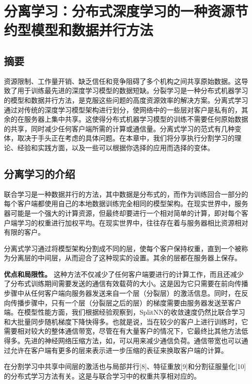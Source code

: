 \chapter{分离学习：分布式深度学习的一种资源节约型模型和数据并行方法}

\section*{摘要}
资源限制、工作量开销、缺乏信任和竞争阻碍了多个机构之间共享原始数据。这导致了用于训练最先进的深度学习模型的数据短缺。分裂学习是一种分布式机器学习的模型和数据并行方法，是克服这些问题的高度资源效率的解决方案。分离式学习通过对传统的深度学习模型架构进行划分，使网络中的一些层对客户是私有的，其余的在服务器上集中共享。这使得分布式机器学习模型的训练不需要任何原始数据的共享，同时减少任何客户端所需的计算或通信量。分离式学习的范式有几种变体，取决于手头正在考虑的具体问题。在本章中，我们将分享执行分割学习的理论、经验和实践方面，以及一些可以根据你选择的应用而选择的变体。

\section{分离学习的介绍}
联合学习是一种数据并行的方法，其中数据是分布式的，而作为训练回合一部分的每个客户端都使用自己的本地数据训练完全相同的模型架构。在现实世界中，服务器可能是一个强大的计算资源，但最终却要进行一个相对简单的计算，即对每个客户端学习的权重进行加权平均。在现实世界中，往往存在着与服务器相比资源相对有限的客户。

分离式学习通过将模型架构分割成不同的层，使每个客户保持权重，直到一个被称为分离层的中间层，从而迎合了这种现实的设置。其余的层都在服务器上保存。

\textbf{优点和局限性。} 这种方法不仅减少了任何客户端要进行的计算工作，而且还减少了分布式训练期间需要发送的通信有效载荷的大小。这是因为它只需要在前向传播步骤中从任何客户端向服务器发送来自一个层（分裂层）的激活信息。同时，在反向传播步骤中，只有一个层（分裂层之后的层）的梯度需要由服务器发送至客户端。在模型性能方面，我们根据经验观察到，SplitNN的收敛速度仍然比联合学习和大批量同步随机梯度下降快得多。也就是说，当在较少的客户上进行训练时，它需要相对较大的整体通信带宽，尽管在有大量客户的情况下，它最终比其他方法低得多。先进的神经网络压缩方法，如，可以用来减少通信负荷。通信带宽也可以通过允许在客户端有更多的层来表示进一步压缩的表征来换取客户端的计算。

在分割学习中共享中间层的激活也与局部并行[8]、特征重放[9]和分割征服量化[10]的分布式学习方法有关。这是与联合学习中的权重共享相对应的。


